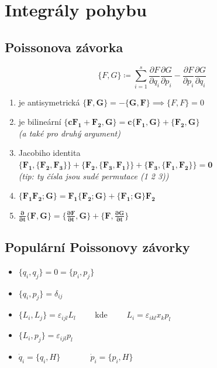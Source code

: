 \documentclass[a5paper,12pt]{article}
\begin{document}
\section{Integrály pohybu}

\subsection{Poissonova závorka}

\begin{equation*}
	\{F, G\} \coloneqq \sum_{i=1}^s \frac{\partial F}{\partial q_i}\frac{\partial G}{\partial p_i} - \frac{\partial F}{\partial p_i}\frac{\partial G}{\partial q_i}
\end{equation*}

\begin{enumerate}
	\item je antisymetrická $\boldsymbol{\{F, G\} = - \{G, F\}} \implies \{F, F\} = 0$
	\item je bilineární $\boldsymbol{\{cF_1 + F_2, G\} = c\{F_1, G\} + \{F_2, G\}}$\\ 
		\textit{(a také pro druhý argument)}
	\item Jacobiho identita\\ 
		$\boldsymbol{\{F_1, \{F_2, F_3\}\} + \{F_2, \{F_3, F_1\}\} + \{F_3, \{F_1, F_2\}\} = 0}$\\ 
		\textit{(tip: ty čísla jsou sudé permutace (1 2 3))}
	\item $\boldsymbol{\{F_1 F_2; G\} = F_1\{F_2; G\} + \{F_1; G\}F_2}$
	\item $\boldsymbol{\frac{\partial}{\partial t} \{F, G\} = \{\frac{\partial F}{\partial t}, G\} + \{F, \frac{\partial G}{\partial t}\}}$
\end{enumerate}

\subsection{Populární Poissonovy závorky}

\begin{itemize}
	\item $\{q_i, q_j\} = 0 = \{p_i, p_j\}$
	\item $\{q_i, p_j\} = \delta_{ij}$
	\item $\{L_i, L_j\} = \varepsilon_{ijl}L_l \qquad$ kde $\qquad L_i = \varepsilon_{ikl}x_k p_l$
	\item $\{L_i, p_j\} = \varepsilon_{ijl}p_l$
	\item $\dot{q}_i = \{q_i, H\}$ $\quad\qquad$ $\dot{p}_i = \{p_i, H\}$
\end{itemize}
\end{document}
